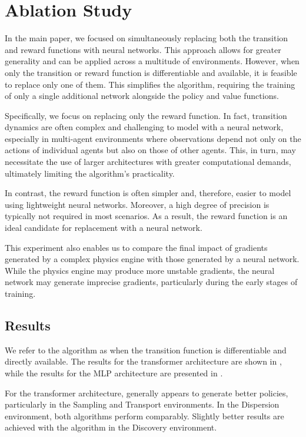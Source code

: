 
\section{Ablation Study}\label{apx:ablation}
In the main paper, we focused on simultaneously replacing both the transition and reward functions with neural networks. This approach allows for greater generality and can be applied across a multitude of environments. However, when only the transition or reward function is differentiable and available, it is feasible to replace only one of them. This simplifies the algorithm, requiring the training of only a single additional network alongside the policy and value functions.

Specifically, we focus on replacing only the reward function. In fact, transition dynamics are often complex and challenging to model with a neural network, especially in multi-agent environments where observations depend not only on the actions of individual agents but also on those of other agents. This, in turn, may necessitate the use of larger architectures with greater computational demands, ultimately limiting the algorithm's practicality.

In contrast, the reward function is often simpler and, therefore, easier to model using lightweight neural networks. Moreover, a high degree of precision is typically not required in most scenarios. As a result, the reward function is an ideal candidate for replacement with a neural network.

This experiment also enables us to compare the final impact of gradients generated by a complex physics engine with those generated by a neural network. While the physics engine may produce more unstable gradients, the neural network may generate imprecise gradients, particularly during the early stages of training.

\subsection{Results}
We refer to the \fname{} algorithm as \fnamer{} when the transition function is differentiable and directly available. The results for the transformer architecture are shown in , while the results for the MLP architecture are presented in .

For the transformer architecture, \fname{} generally appears to generate better policies, particularly in the Sampling and Transport environments. In the Dispersion environment, both algorithms perform comparably. Slightly better results are achieved with the \fnamer{} algorithm in the Discovery environment.

